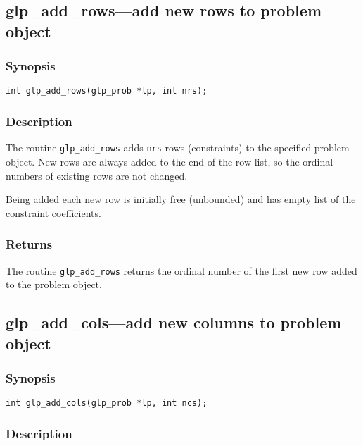 \subsection{glp\_add\_rows---add new rows to problem object}

\subsubsection*{Synopsis}

\begin{verbatim}
int glp_add_rows(glp_prob *lp, int nrs);
\end{verbatim}

\subsubsection*{Description}

The routine \verb|glp_add_rows| adds \verb|nrs| rows (constraints) to
the specified problem object. New rows are always added to the end of
the row list, so the ordinal numbers of existing rows are not changed.

Being added each new row is initially free (unbounded) and has empty
list of the constraint coefficients.

\subsubsection*{Returns}

The routine \verb|glp_add_rows| returns the ordinal number of the first
new row added to the problem object.

\newpage

\subsection{glp\_add\_cols---add new columns to problem object}

\subsubsection*{Synopsis}

\begin{verbatim}
int glp_add_cols(glp_prob *lp, int ncs);
\end{verbatim}

\subsubsection*{Description}

